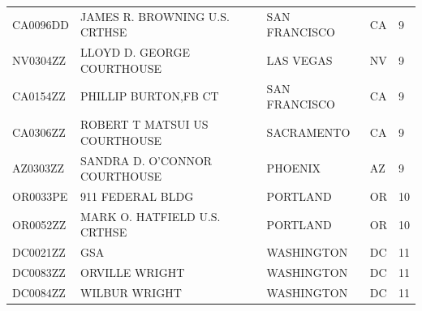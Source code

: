 \documentclass[12pt]{article}
\begin{document}
{\begin{longtable}{lllll}
CA0096DD         & JAMES R. BROWNING U.S. CRTHSE   & SAN FRANCISCO  & CA    & 9      \\
NV0304ZZ         & LLOYD D. GEORGE COURTHOUSE      & LAS VEGAS      & NV    & 9      \\
CA0154ZZ         & PHILLIP BURTON,FB CT            & SAN FRANCISCO  & CA    & 9      \\
CA0306ZZ         & ROBERT T MATSUI US COURTHOUSE   & SACRAMENTO     & CA    & 9      \\
AZ0303ZZ         & SANDRA D. O'CONNOR COURTHOUSE   & PHOENIX        & AZ    & 9      \\
OR0033PE         & 911 FEDERAL BLDG                & PORTLAND       & OR    & 10     \\
OR0052ZZ         & MARK O. HATFIELD U.S. CRTHSE    & PORTLAND       & OR    & 10     \\
DC0021ZZ         & GSA                             & WASHINGTON     & DC    & 11     \\
DC0083ZZ         & ORVILLE WRIGHT                  & WASHINGTON     & DC    & 11     \\
DC0084ZZ         & WILBUR WRIGHT                   & WASHINGTON     & DC    & 11     \\
\hline
\end{longtable}}
\FloatBarrier
\end{document}

